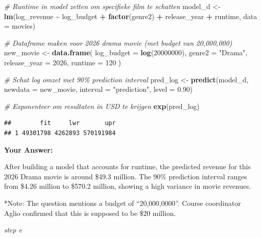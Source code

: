 \documentclass[
]{article}
\newenvironment{Shaded}{\begin{snugshade}}{\end{snugshade}}
\newcommand{\AttributeTok}[1]{\textcolor[rgb]{0.13,0.29,0.53}{#1}}
\newcommand{\CommentTok}[1]{\textcolor[rgb]{0.56,0.35,0.01}{\textit{#1}}}
\newcommand{\DecValTok}[1]{\textcolor[rgb]{0.00,0.00,0.81}{#1}}
\newcommand{\FloatTok}[1]{\textcolor[rgb]{0.00,0.00,0.81}{#1}}
\newcommand{\FunctionTok}[1]{\textcolor[rgb]{0.13,0.29,0.53}{\textbf{#1}}}
\newcommand{\NormalTok}[1]{#1}
\newcommand{\OtherTok}[1]{\textcolor[rgb]{0.56,0.35,0.01}{#1}}
\newcommand{\SpecialCharTok}[1]{\textcolor[rgb]{0.81,0.36,0.00}{\textbf{#1}}}
\newcommand{\StringTok}[1]{\textcolor[rgb]{0.31,0.60,0.02}{#1}}
\begin{document}
\begin{Shaded}
\begin{Highlighting}[]
\CommentTok{\# Runtime in model zetten om specifieke film te schatten}
\NormalTok{model\_d }\OtherTok{\textless{}{-}} \FunctionTok{lm}\NormalTok{(log\_revenue }\SpecialCharTok{\textasciitilde{}}\NormalTok{ log\_budget }\SpecialCharTok{+} \FunctionTok{factor}\NormalTok{(genre2) }\SpecialCharTok{+}\NormalTok{ release\_year }\SpecialCharTok{+}\NormalTok{ runtime, }\AttributeTok{data =}\NormalTok{ movies)}

\CommentTok{\# Dataframe maken voor 2026 drama movie (met budget van 20,000,000)}
\NormalTok{new\_movie }\OtherTok{\textless{}{-}} \FunctionTok{data.frame}\NormalTok{(}
  \AttributeTok{log\_budget =} \FunctionTok{log}\NormalTok{(}\DecValTok{20000000}\NormalTok{),}
  \AttributeTok{genre2 =} \StringTok{"Drama"}\NormalTok{,}
  \AttributeTok{release\_year =} \DecValTok{2026}\NormalTok{,}
  \AttributeTok{runtime =} \DecValTok{120}
\NormalTok{)}

\CommentTok{\# Schat log omzet met 90\% prediction interval}
\NormalTok{pred\_log }\OtherTok{\textless{}{-}} \FunctionTok{predict}\NormalTok{(model\_d, }\AttributeTok{newdata =}\NormalTok{ new\_movie, }\AttributeTok{interval =} \StringTok{"prediction"}\NormalTok{, }\AttributeTok{level =} \FloatTok{0.90}\NormalTok{)}

\CommentTok{\# Exponenteer om resultaten in USD te krijgen}
\FunctionTok{exp}\NormalTok{(pred\_log)}
\end{Highlighting}
\end{Shaded}

\begin{verbatim}
##        fit     lwr       upr
## 1 49301798 4262893 570191984
\end{verbatim}

\textbf{Your Answer:}

After building a model that accounts for runtime, the predicted revenue
for this 2026 Drama movie is around \$49.3 million. The 90\% prediction
interval ranges from \$4.26 million to \$570.2 million, showing a high
variance in movie revenues.

*Note: The question mentions a budget of ``20,000,0000''. Course
coordinator Aglio confirmed that this is supposed to be \$20 million.

\emph{step e}

\begin{Shaded}
\end{Shaded}
\end{document}

